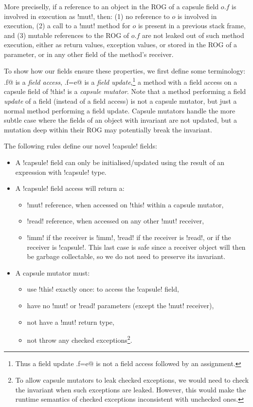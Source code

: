 More preciselly, if a reference to an object in the ROG of a capsule field $o.f$ is involved in execution as \Q!mut!, then:
(1) no reference to $o$ is involved in execution,
(2) a call to a \Q!mut! method for $o$ is present in a previous stack frame, and
(3) mutable references to the ROG of $o.f$ are not leaked out of such method execution, either as return values, exception values, or stored in the ROG of a parameter, or in any other field of the method's receiver.


To show how our \Q@capsule@ fields ensure these properties, we first define some terminology:
\Q@x.f@ is a \emph{field access}, \Q@x.f=e@ is a \emph {field update},\footnote{Thus a field update \Q@x.f=e@ is not a field access followed by an assignment.}
a \Q@mut@ method with a field access on a capsule field of \Q!this! is a \emph{capsule mutator}. 
Note that a method performing a field \emph{update} of a \Q@capsule@ field (instead of a field access) is not a capsule mutator, but just a normal method performing a field update.
Capsule mutators handle the more subtle case where the fields of an object with invariant are not updated, but a mutation deep within their ROG may potentially break the invariant.

The following rules define our novel \Q!capsule! fields:
\begin{itemize}
\item A \Q!capsule! field can only be initialised/updated using the result of an expression with  \Q!capsule! type.
\item A \Q!capsule! field access will return a:
\begin{itemize}
\item \Q!mut! reference, when accessed on \Q!this! within a capsule mutator,
\item \Q!read! reference, when accessed on any other \Q!mut! receiver,
\item \Q!imm! if the receiver is \Q!imm!, \Q!read! if the receiver is \Q!read!, or \Q@capsule@ if the receiver is
\Q!capsule!. This last case is safe since a \Q@capsule@ receiver object will then be garbage collectable, so we do not need to preserve its invariant.
\end{itemize}
\item A capsule mutator must:
\begin{itemize}
\item use \Q!this! exactly once: to access the \Q!capsule! field,
\item have no \Q!mut! or \Q!read! parameters (except the \Q!mut! receiver),
\item not have a \Q!mut! return type,
\item not throw any checked exceptions\footnote{To allow capsule mutators to leak checked exceptions, we would need to check the invariant when such exceptions are leaked. However, this would make the runtime semantics of checked exceptions inconsistent with unchecked ones.}.
\end{itemize}
\end{itemize}	

